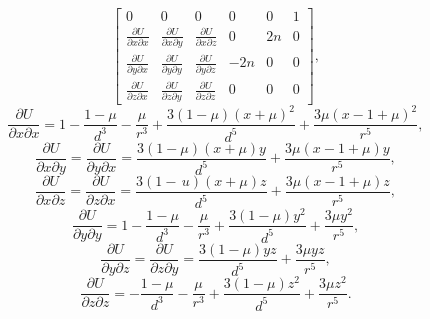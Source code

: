 \begin{equation}
\begin{bmatrix}
                            0                                       &   0                                       &   0                                       &   0   &   0   &   1   \\
                            \frac{\partial U}{\partial x\partial x} &   \frac{\partial U}{\partial x\partial y} &   \frac{\partial U}{\partial x\partial z} &   0   &   2n  &   0   \\
                            \frac{\partial U}{\partial y\partial x} &   \frac{\partial U}{\partial y\partial y} &   \frac{\partial U}{\partial y\partial z} &   -2n &   0   &   0   \\
                            \frac{\partial U}{\partial z\partial x} &   \frac{\partial U}{\partial z\partial y} &   \frac{\partial U}{\partial z\partial z} &   0   &   0   &   0   \end{bmatrix},
                            \label{eq:variationalJacobian}
\end{equation}
\begin{equation}
    \frac{\partial U}{\partial x\partial x}=1-\frac{1-\mu}{d^{3}}-\frac{\mu}{r^{3}}+\frac{3(1-\mu)(x+\mu)^{2}}{d^{5}}+\frac{3\mu(x-1+\mu)^{2}}{r^{5}},
    \label{eq:partialUpartialxx}
\end{equation}
\begin{equation}
    \frac{\partial U}{\partial x\partial y}=\frac{\partial U}{\partial y\partial x}=\frac{3(1-\mu)(x+\mu)y}{d^{5}}+\frac{3\mu(x-1+\mu)y}{r^{5}},
    \label{eq:partialUpartialxy}
\end{equation}
\begin{equation}
    \frac{\partial U}{\partial x\partial z}=\frac{\partial U}{\partial z\partial x}=\frac{3(1-\,u)(x+\mu)z}{d^{5}}+\frac{3\mu(x-1+\mu)z}{r^{5}},
    \label{eq:partialUpartialxz}
\end{equation}
\begin{equation}
    \frac{\partial U}{\partial y\partial y}=1-\frac{1-\mu}{d^{3}}-\frac{\mu}{r^{3}}+\frac{3(1-\mu)y^{2}}{d^{5}}+\frac{3\mu y^{2}}{r^{5}},
    \label{eq:partialUpartialyy}
\end{equation}
\begin{equation}
    \frac{\partial U}{\partial y\partial z}=\frac{\partial U}{\partial z\partial y}=\frac{3(1-\mu)yz}{d^{5}}+\frac{3\mu yz}{r^{5}},
    \label{eq:partialUpartialyz}
\end{equation}
\begin{equation}
    \frac{\partial U}{\partial z\partial z}=-\frac{1-\mu}{d^{3}}-\frac{\mu}{r^{3}}+\frac{3(1-\mu)z^{2}}{d^{5}}+\frac{3\mu z^{2}}{r^{5}}.
    \label{eq:partialUpartialzz}
\end{equation}
